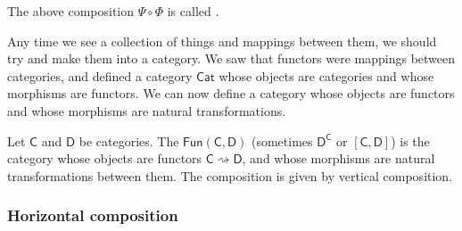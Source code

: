 \documentclass[notes.tex]{subfiles}
\begin{document}
\begin{definition}
  \label{def:verticalcomposition}
  The above composition $\Psi \circ \Phi$ is called .
\end{definition}

Any time we see a collection of things and mappings between them, we should try and make them into a category. We saw that functors were mappings between categories, and defined a category $\mathsf{Cat}$ whose objects are categories and whose morphisms are functors. We can now define a category whose objects are functors and whose morphisms are natural transformations.

\begin{definition}
  \label{def:functorcategory}
  Let $\mathsf{C}$ and $\mathsf{D}$ be categories. The  $\mathsf{Fun}(\mathsf{C}, \mathsf{D})$ (sometimes $\mathsf{D}^{\mathsf{C}}$ or $[\mathsf{C},\mathsf{D}]$) is the category whose objects are functors $\mathsf{C} \rightsquigarrow \mathsf{D}$, and whose morphisms are natural transformations between them. The composition is given by vertical composition.
\end{definition}


\subsubsection{Horizontal composition}
\end{document}
